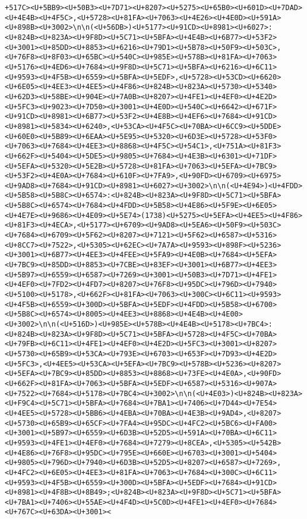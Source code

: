 \documentclass[
]{article}
\begin{document}
\begin{verbatim}
+517C><U+5BB9><U+50B3><U+7D71><U+8207><U+5275><U+65B0><U+601D><U+7DAD><U+4E4B><U+4F5C>,<U+5728><U+81FA><U+7063><U+4E26><U+4E0D><U+591A><U+898B><U+3002>\n\n(<U+56DB>)<U+5177><U+91CD><U+8981><U+6027>:<U+824B><U+823A><U+9F8D><U+5C71><U+5BFA><U+4E4B><U+6B77><U+53F2><U+3001><U+85DD><U+8853><U+6216><U+79D1><U+5B78><U+50F9><U+503C>,<U+76F8><U+8F03><U+65BC><U+540C><U+985E><U+578B><U+81FA><U+7063><U+5176><U+4ED6><U+7684><U+9F8D><U+5C71><U+5BFA><U+6216><U+6C11><U+9593><U+4F5B><U+6559><U+5BFA><U+5EDF>,<U+5728><U+53CD><U+6620><U+6E05><U+4EE3><U+4EE5><U+4F86><U+824B><U+823A><U+5730><U+5340><U+62D3><U+58BE><U+904E><U+7A0B><U+8207><U+4FE1><U+4EF0><U+4E2D><U+5FC3><U+9023><U+7D50><U+3001><U+4E0D><U+540C><U+6642><U+671F><U+91CD><U+8981><U+6B77><U+53F2><U+4E8B><U+4EF6><U+7684><U+91CD><U+8981><U+5834><U+6240>,<U+53CA><U+4F5C><U+70BA><U+6CC9><U+5DDE><U+60E0><U+5B89><U+6EAA><U+5E95><U+5320><U+6D3E><U+5728><U+53F0><U+7063><U+7684><U+4EE3><U+8868><U+4F5C><U+54C1>,<U+751A><U+81F3><U+662F><U+5404><U+5DE5><U+9805><U+7684><U+4E3B><U+6301><U+71DF><U+5EFA><U+5320><U+5E2B><U+5728><U+81FA><U+7063><U+5EFA><U+7BC9><U+53F2><U+4E0A><U+7684><U+610F><U+7FA9>,<U+90FD><U+6709><U+6975><U+9AD8><U+7684><U+91CD><U+8981><U+6027><U+3002>\n\n(<U+4E94>)<U+4FDD><U+5B58><U+5B8C><U+6574>:<U+824B><U+823A><U+9F8D><U+5C71><U+5BFA><U+5B8C><U+6574><U+7684><U+4FDD><U+5B58><U+4E86><U+5F9E><U+6E05><U+4E7E><U+9686><U+4E09><U+5E74>(1738)<U+5275><U+5EFA><U+4EE5><U+4F86><U+81F3><U+4ECA>,<U+5177><U+6709><U+9AD8><U+5EA6><U+50F9><U+503C><U+7684><U+6709><U+5F62><U+8207><U+7121><U+5F62><U+6587><U+5316><U+8CC7><U+7522>,<U+5305><U+62EC><U+7A7A><U+9593><U+898F><U+5236><U+3001><U+6B77><U+4EE3><U+4FEE><U+5FA9><U+4E0B><U+7684><U+5EFA><U+7BC9><U+85DD><U+8853><U+7CBE><U+83EF><U+3001><U+6B77><U+4EE3><U+5B97><U+6559><U+6587><U+7269><U+3001><U+50B3><U+7D71><U+4FE1><U+4EF0><U+7FD2><U+4FD7><U+8207><U+76F8><U+95DC><U+796D><U+7940><U+5100><U+5178>,<U+662F><U+81FA><U+7063><U+300C><U+6C11><U+9593><U+4F5B><U+6559><U+300D><U+5BFA><U+5EDF><U+4FDD><U+5B58><U+6700><U+5B8C><U+6574><U+8005><U+4EE3><U+8868><U+4E4B><U+4E00><U+3002>\n\n(<U+516D>)<U+985E><U+578B><U+4E4B><U+5178><U+7BC4>:<U+824B><U+823A><U+9F8D><U+5C71><U+5BFA><U+5728><U+4F5C><U+70BA><U+79FB><U+6C11><U+4FE1><U+4EF0><U+4E2D><U+5FC3><U+3001><U+8207><U+5730><U+65B9><U+53CA><U+793E><U+6703><U+653F><U+7D93><U+4E2D><U+5FC3>,<U+4EE5><U+53CA><U+5EFA><U+7BC9><U+578B><U+5236><U+8207><U+5EFA><U+7BC9><U+85DD><U+8853><U+8868><U+73FE><U+4E0A>,<U+90FD><U+662F><U+81FA><U+7063><U+5BFA><U+5EDF><U+6587><U+5316><U+907A><U+7522><U+7684><U+5178><U+7BC4><U+3002>\n\n(<U+4E03>)<U+824B><U+823A><U+F9C4><U+5C71><U+5BFA><U+7684><U+7BA1><U+7406><U+7D44><U+7E54><U+4EE5><U+5728><U+5BB6><U+4EBA><U+70BA><U+4E3B><U+9AD4>,<U+8207><U+5730><U+65B9><U+65CF><U+7FA4><U+95DC><U+4FC2><U+5BC6><U+FA00><U+3001><U+5B97><U+6559><U+6D3B><U+52D5><U+591A><U+70BA><U+6C11><U+9593><U+4FE1><U+4EF0><U+7684><U+7279><U+8CEA>,<U+5305><U+542B><U+4E86><U+76F8><U+95DC><U+795E><U+660E><U+6703><U+3001><U+5404><U+9805><U+796D><U+7940><U+6D3B><U+52D5><U+8207><U+6587><U+7269>,<U+4FC2><U+6E05><U+4EE3><U+81FA><U+7063><U+7684><U+300C><U+6C11><U+9593><U+4F5B><U+6559><U+300D><U+5BFA><U+5EDF><U+7684><U+91CD><U+8981><U+4F8B><U+8B49>;<U+824B><U+823A><U+9F8D><U+5C71><U+5BFA><U+7BA1><U+7406><U+55AE><U+4F4D><U+5C0D><U+4FE1><U+4EF0><U+7684><U+767C><U+63DA><U+3001><
\end{verbatim}
\end{document}
